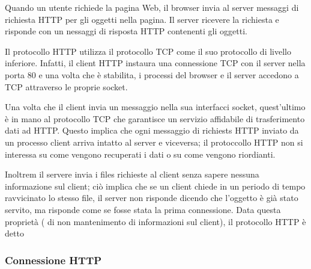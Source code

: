 \documentclass{book}
\newcommand{\tmtextbf}[1]{\text{{\bfseries{#1}}}}
\begin{document}
{}

Quando un utente richiede la pagina Web, il browser invia al server messaggi
di richiesta HTTP per gli oggetti nella pagina. Il server ricevere la
richiesta e risponde con un nessaggi di risposta HTTP contenenti gli oggetti.

Il protocollo HTTP utilizza il protocollo TCP come il suo protocollo di
livello inferiore. Infatti, il client HTTP instaura una connessione TCP con il
server nella porta 80 e una volta che {\`e} stabilita, i processi del browser
e il server accedono a TCP attraverso le proprie socket.

Una volta che il client invia un messaggio nella sua interfacci socket,
quest'ultimo {\`e} in mano al protocollo TCP che garantisce un servizio
affidabile di trasferimento dati ad HTTP. Questo implica che ogni messaggio di
richiests HTTP inviato da un processo client arriva intatto al server e
viceversa; il protoccollo HTTP non si interessa su come vengono recuperati i
dati o su come vengono riordianti.

Inoltrem il servere invia i files richieste al client senza sapere nessuna
informazione sul client; ci{\`o} implica che se un client chiede in un periodo
di tempo ravvicinato lo stesso file, il server non risponde dicendo che
l'oggetto {\`e} gi{\`a} stato servito, ma risponde come se fosse stata la
prima connessione. Data questa propriet{\`a} ( di non mantenimento di
informazioni sul client), il protocollo HTTP {\`e} detto \tmtextbf{protocollo
stateless.}

\subsubsection{Connessione HTTP}
\end{document}
